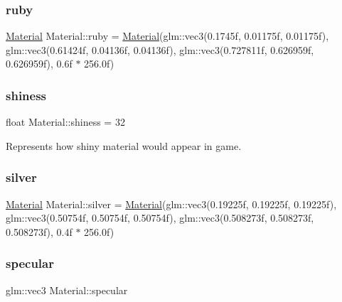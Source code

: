 \mbox{\label{struct_material_ae269e4b2375a840f121a2560a9d2b05b}} 
\subsubsection{\texorpdfstring{ruby}{ruby}}
{\footnotesize\ttfamily \mbox{\hyperlink{struct_material}{Material}} Material\+::ruby = \mbox{\hyperlink{struct_material}{Material}}(glm\+::vec3(0.\+1745f, 0.\+01175f, 0.\+01175f), glm\+::vec3(0.\+61424f, 0.\+04136f, 0.\+04136f), glm\+::vec3(0.\+727811f, 0.\+626959f, 0.\+626959f), 0.\+6f $\ast$ 256.\+0f)\hspace{0.3cm}{\ttfamily [static]}}

\mbox{\label{struct_material_ac40b4d892e9bff09f793d86ca1f3257e}} 
\subsubsection{\texorpdfstring{shiness}{shiness}}
{\footnotesize\ttfamily float Material\+::shiness = 32}



Represents how shiny material would appear in game. 

\mbox{\label{struct_material_aef9dfcd5c4f7aaa53ee68831a19f68ca}} 
\subsubsection{\texorpdfstring{silver}{silver}}
{\footnotesize\ttfamily \mbox{\hyperlink{struct_material}{Material}} Material\+::silver = \mbox{\hyperlink{struct_material}{Material}}(glm\+::vec3(0.\+19225f, 0.\+19225f, 0.\+19225f), glm\+::vec3(0.\+50754f, 0.\+50754f, 0.\+50754f), glm\+::vec3(0.\+508273f, 0.\+508273f, 0.\+508273f), 0.\+4f $\ast$ 256.\+0f)\hspace{0.3cm}{\ttfamily [static]}}

\mbox{\label{struct_material_aac1c499923ff99564cdd97a4b5e504a9}} 
\subsubsection{\texorpdfstring{specular}{specular}}
{\footnotesize\ttfamily glm\+::vec3 Material\+::specular}



